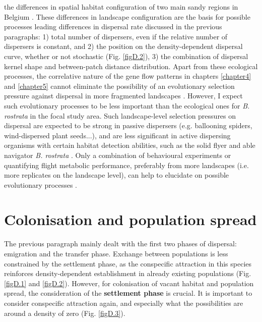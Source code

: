 \documentclass[10pt, twoside]{book} %
\begin{document}
the differences in spatial habitat configuration of two main sandy regions in Belgium \citep{vanstrien2015}. These differences in landscape configuration are the basis for possible processes leading differences in dispersal rate discussed in the previous paragraphs: 1) total number of dispersers, even if the relative number of dispersers is constant, and 2) the position on the density-dependent dispersal curve, whether or not stochastic (Fig. \ref{figD.2}), 3) the combination of dispersal kernel shape and between-patch distance distribution. Apart from these ecological processes, the correlative nature of the gene flow patterns in chapters \ref{chapter4} and \ref{chapter5} cannot eliminate the possibility of an evolutionary selection pressure against dispersal in more fragmented landscapes \citep{schtickzelle2006, bonte2010, cheptou2017}. However, I expect such evolutionary processes to be less important than the ecological ones for \textit{B. rostrata} in the focal study area. Such landscape-level selection pressures on dispersal are expected to be strong in passive dispersers (e.g. ballooning spiders, wind-dispersed plant seeds...), and are less significant in active dispersing organisms with certain habitat detection abilities, such as the solid flyer and able navigator \textit{B. rostrata} \citep{tengo1990, schone1991, lima1996, bonte2010}. Only a combination of behavioural experiments or quantifying flight metabolic performance, preferably from more landscapes (i.e. more replicates on the landscape level), can help to elucidate on possible evolutionary processes \citep{hanski2004, schtickzelle2006}.\\
	
	\section{Colonisation and population spread}
	The previous paragraph mainly dealt with the first two phases of dispersal: emigration and the transfer phase. Exchange between populations is less constrained by the settlement phase, as the conspecific attraction in this species reinforces density-dependent establishment in already existing populations (Fig. \ref{figD.1} and \ref{figD.2}). However, for colonisation of vacant habitat and population spread, the consideration of the \textbf{settlement phase} is crucial. It is important to consider conspecific attraction again, and especially what the possibilities are around a density of zero (Fig. \ref{figD.3}).\\
	
\end{document}
